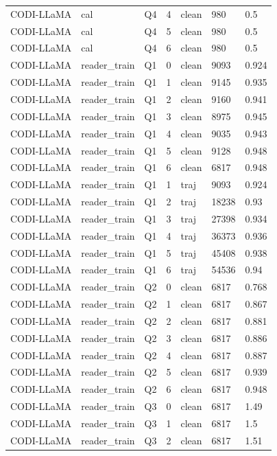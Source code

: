 \begin{longtable}{@{}p{}p{}p{}p{}p{}p{}p{}@{}}
CODI-LLaMA & cal & Q4 & 4 & clean & 980 & 0.5 \\
CODI-LLaMA & cal & Q4 & 5 & clean & 980 & 0.5 \\
CODI-LLaMA & cal & Q4 & 6 & clean & 980 & 0.5 \\
CODI-LLaMA & reader\_train & Q1 & 0 & clean & 9093 & 0.924 \\
CODI-LLaMA & reader\_train & Q1 & 1 & clean & 9145 & 0.935 \\
CODI-LLaMA & reader\_train & Q1 & 2 & clean & 9160 & 0.941 \\
CODI-LLaMA & reader\_train & Q1 & 3 & clean & 8975 & 0.945 \\
CODI-LLaMA & reader\_train & Q1 & 4 & clean & 9035 & 0.943 \\
CODI-LLaMA & reader\_train & Q1 & 5 & clean & 9128 & 0.948 \\
CODI-LLaMA & reader\_train & Q1 & 6 & clean & 6817 & 0.948 \\
CODI-LLaMA & reader\_train & Q1 & 1 & traj & 9093 & 0.924 \\
CODI-LLaMA & reader\_train & Q1 & 2 & traj & 18238 & 0.93 \\
CODI-LLaMA & reader\_train & Q1 & 3 & traj & 27398 & 0.934 \\
CODI-LLaMA & reader\_train & Q1 & 4 & traj & 36373 & 0.936 \\
CODI-LLaMA & reader\_train & Q1 & 5 & traj & 45408 & 0.938 \\
CODI-LLaMA & reader\_train & Q1 & 6 & traj & 54536 & 0.94 \\
CODI-LLaMA & reader\_train & Q2 & 0 & clean & 6817 & 0.768 \\
CODI-LLaMA & reader\_train & Q2 & 1 & clean & 6817 & 0.867 \\
CODI-LLaMA & reader\_train & Q2 & 2 & clean & 6817 & 0.881 \\
CODI-LLaMA & reader\_train & Q2 & 3 & clean & 6817 & 0.886 \\
CODI-LLaMA & reader\_train & Q2 & 4 & clean & 6817 & 0.887 \\
CODI-LLaMA & reader\_train & Q2 & 5 & clean & 6817 & 0.939 \\
CODI-LLaMA & reader\_train & Q2 & 6 & clean & 6817 & 0.948 \\
CODI-LLaMA & reader\_train & Q3 & 0 & clean & 6817 & 1.49 \\
CODI-LLaMA & reader\_train & Q3 & 1 & clean & 6817 & 1.5 \\
CODI-LLaMA & reader\_train & Q3 & 2 & clean & 6817 & 1.51 \\

\end{longtable}
